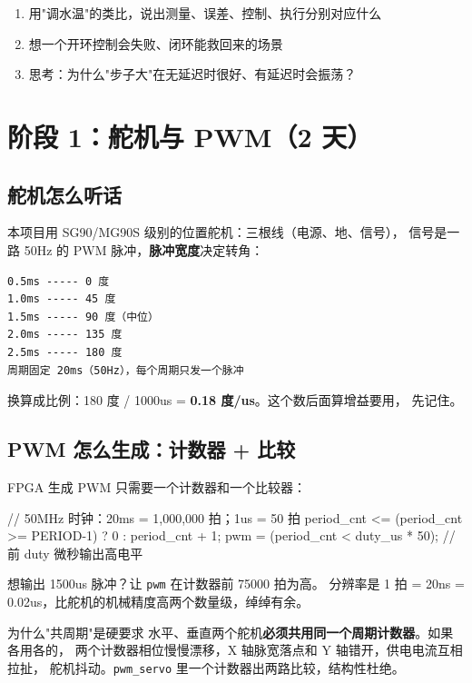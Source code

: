 \documentclass[11pt]{ctexart}
\newcommand{\code}[1]{\texttt{#1}}
\begin{document}
\begin{enumerate}
  \item 用"调水温"的类比，说出测量、误差、控制、执行分别对应什么
  \item 想一个开环控制会失败、闭环能救回来的场景
  \item 思考：为什么"步子大"在无延迟时很好、有延迟时会振荡？
\end{enumerate}

\section{阶段 1：舵机与 PWM（2 天）}

\subsection{舵机怎么听话}

本项目用 SG90/MG90S 级别的位置舵机：三根线（电源、地、信号），
信号是一路 50Hz 的 PWM 脉冲，\textbf{脉冲宽度}决定转角：

\begin{Verbatim}
0.5ms ----- 0 度
1.0ms ----- 45 度
1.5ms ----- 90 度（中位）
2.0ms ----- 135 度
2.5ms ----- 180 度
周期固定 20ms（50Hz），每个周期只发一个脉冲
\end{Verbatim}

换算成比例：180 度 / 1000us = \textbf{0.18 度/us}。这个数后面算增益要用，
先记住。

\subsection{PWM 怎么生成：计数器 + 比较}

FPGA 生成 PWM 只需要一个计数器和一个比较器：

\begin{Verilog}
// 50MHz 时钟：20ms = 1,000,000 拍；1us = 50 拍
period_cnt <= (period_cnt >= PERIOD-1) ? 0 : period_cnt + 1;
pwm = (period_cnt < duty_us * 50);   // 前 duty 微秒输出高电平
\end{Verilog}

想输出 1500us 脉冲？让 \code{pwm} 在计数器前 75000 拍为高。
分辨率是 1 拍 = 20ns = 0.02us，比舵机的机械精度高两个数量级，绰绰有余。

\begin{keybox}{为什么"共周期"是硬要求}
水平、垂直两个舵机\textbf{必须共用同一个周期计数器}。如果各用各的，
两个计数器相位慢慢漂移，X 轴脉宽落点和 Y 轴错开，供电电流互相拉扯，
舵机抖动。\code{pwm\_servo} 里一个计数器出两路比较，结构性杜绝。
\end{keybox}
\end{document}
